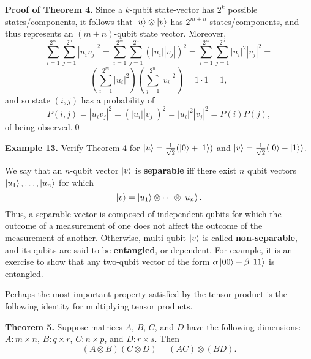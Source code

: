 \documentclass [12pt]{article}
\theoremstyle{definition}
\begin{document}
\textbf{Proof of Theorem 4.} Since a $k$-qubit state-vector has $2^{k}$ possible states/components, it follows that 
$\ket{u}\otimes\ket{v}$ has $2^{m+n}$ states/components, and thus represents an $(m+n)$-qubit state vector. Moreover,
\[\sum_{i=1}^{2^m}\sum_{j=1}^{2^n} |u_iv_j|^2 =\sum_{i=1}^{2^m}\sum_{j=1}^{2^n} (|u_i||v_j|)^2 = \sum_{i=1}^{2^m}\sum_{j=1}^{2^n} |u_i|^2 |v_j|^2 = \]
\[(\sum_{i=1}^{2^m} |u_i|^2)(\sum_{j=1}^{2^n} |v_i|^2) = 1\cdot 1 = 1,\]
and so state $(i,j)$ has a probability of 
\[P(i,j)= |u_iv_j|^2 = (|u_i||v_j|)^2 = |u_i|^2 |v_j|^2 = P(i)P(j),\]
of being observed.\qed

\newpage
\textbf{Example 13.} Verify Theorem 4 for $\ket{u} = \frac{1}{\sqrt{2}}(\ket{0}+\ket{1})$ and
$\ket{v} = \frac{1}{\sqrt{2}}(\ket{0}-\ket{1})$. 


\newpage
We say that an $n$-qubit vector $\ket{v}$ is \textbf{separable} iff there exist $n$ qubit vectors $\ket{u_1},\ldots,\ket{u_n}$ for which
\[\ket{v}=\ket{u_1}\otimes \cdots \otimes \ket{u_n}.\] 
Thus, a separable vector is composed of independent qubits for which the outcome of a measurement of one does not affect the outcome of the measurement of another. 
Otherwise, multi-qubit $\ket{v}$ is called \textbf{non-separable}, and its qubits are said to be \textbf{entangled}, or dependent. 
For example, it is an exercise to show that any two-qubit vector of the form $\alpha\ket{00}+\beta\ket{11}$ is entangled.

Perhaps the most important property satisfied by the tensor product is the following identity for multiplying tensor products.

\textbf{Theorem 5.} Suppose matrices $A$, $B$, $C$, and $D$ have the following dimensions: $A:m\times n$, $B:q\times r$, $C:n\times p$, and $D:r\times s$. 
Then 
\[(A\otimes B)(C\otimes D) = (AC)\otimes (BD).\]
\end{document}
